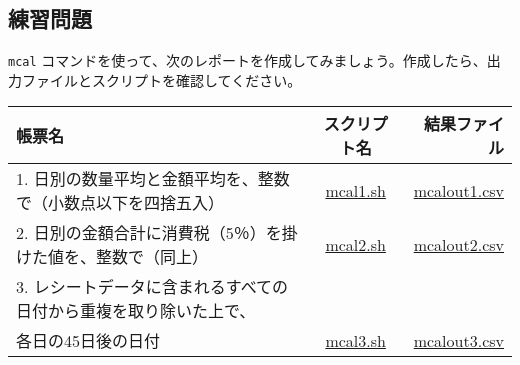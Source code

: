 \vspace {5mm}

\subsection{練習問題}

\verb|mcal| コマンドを使って、次のレポートを作成してみましょう。作成したら、出力ファイルとスクリプトを確認してください。

\begin{table}[htbp]
{\small
\begin{tabular}{ l | c || r }
\hline
\textbf{帳票名}   & \textbf{スクリプト名} & \textbf{結果ファイル}  \\
\hline
1. 日別の数量平均と金額平均を、整数で（小数点以下を四捨五入） & \href{exercise/mcal1.sh}{mcal1.sh} & \href{exercise/outdat/mcalout1.csv}{mcalout1.csv} \\
2. 日別の金額合計に消費税（5％）を掛けた値を、整数で（同上） & \href{exercise/mcal2.sh}{mcal2.sh} & \href{exercise/outdat/mcalout2.csv}{mcalout2.csv} \\
3. レシートデータに含まれるすべての日付から重複を取り除いた上で、\\ 各日の45日後の日付 & \href{exercise/mcal3.sh}{mcal3.sh} & \href{exercise/outdat/mcalout3.csv}{mcalout3.csv} \\



\hline
\end{tabular} 
}
\end{table} 


%
